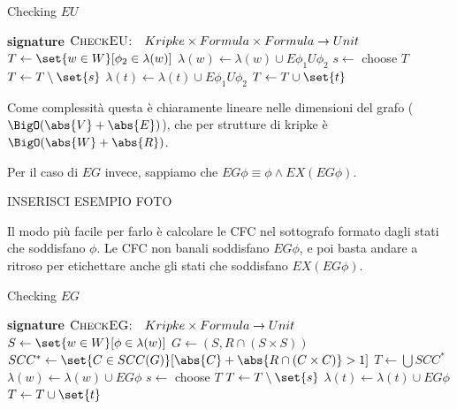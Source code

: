 \begin{algorithmdesc}{Checking \(EU\)}
  \begin{algorithmic}[1]
    \Statex{} \textbf{signature} \(\textsc{CheckEU:} \quad Kripke \times Formula \times Formula \to Unit\)
      \State{} \(T \gets \set{w \in W}[ \phi_2 \in \lambda(w)]\)
        \State{} \(\lambda(w) \gets \lambda(w)\cup{E \phi_1 U \phi_2}\) 
      \EndFor{}
        \State{} \(s \gets\) choose \(T\)
        \State{} \(T \gets T\setminus\set{s}\)
            \State{} \(\lambda(t) \gets \lambda(t)\cup{E \phi_1 U \phi_2}\)
            \State{} \(T \gets T\cup\set{t}\)
          \EndIf{}
        \EndFor{}
      \EndWhile{}
    \EndFunction{}
  \end{algorithmic}
\end{algorithmdesc}

Come complessità questa è chiaramente lineare nelle dimensioni del grafo (\(\BigO(\abs{V} + \abs{E})\)), che per strutture di kripke è \(\BigO(\abs{W} + \abs{R})\).

Per il caso di \(EG\) invece, sappiamo che \(EG \phi \equiv \phi \land EX (EG \phi)\).

INSERISCI ESEMPIO FOTO

Il modo più facile per farlo è calcolare le CFC nel sottografo formato dagli stati che soddisfano \(\phi\). Le CFC non banali soddisfano \(EG \phi\), e poi basta andare a ritroso per etichettare anche gli stati che soddisfano \(EX(EG \phi)\).

\begin{algorithmdesc}{Checking \(EG\)}
  \begin{algorithmic}[1]
    \Statex{} \textbf{signature} \(\textsc{CheckEG:} \quad Kripke \times Formula \to Unit\)
      \State{} \(S \gets \set{w \in W}[\phi \in \lambda(w)]\)
      \State{} \(G \gets (S, R\cap(S\times S))\)
      \State{} \(SCC^* \gets \set{C \in SCC(G)}[\abs{C} + \abs{R\cap(C\times C)} > 1]\)
      \State{} \(T \gets \bigcup SCC^*\)
        \State{} \(\lambda(w) \gets \lambda(w)\cup{E G \phi}\) 
      \EndFor{}
        \State{} \(s \gets\) choose \(T\)
        \State{} \(T \gets T\setminus\set{s}\)
            \State{} \(\lambda(t) \gets \lambda(t)\cup{E G \phi}\)
            \State{} \(T \gets T\cup\set{t}\)
          \EndIf{}
        \EndFor{}
      \EndWhile{}
    \EndFunction{}
  \end{algorithmic}
\end{algorithmdesc}

